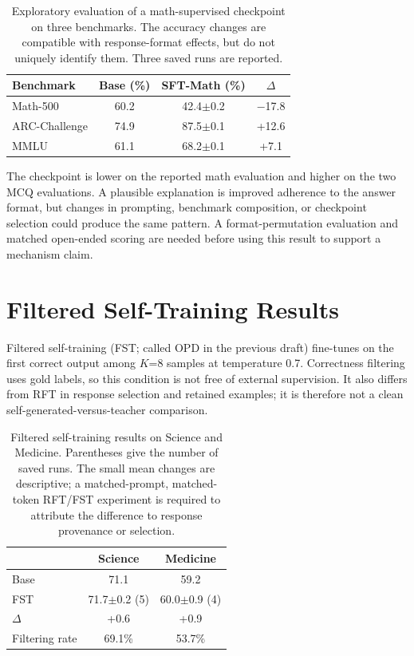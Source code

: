 \documentclass[11pt]{article}
\begin{document}
\begin{table}[h]
\centering
\small
\begin{tabular}{@{}lccc@{}}
\toprule
\textbf{Benchmark} & \textbf{Base (\%)} & \textbf{SFT-Math (\%)} & \textbf{$\Delta$} \\
\midrule
Math-500 & 60.2 & 42.4$\pm$0.2 & $-$17.8 \\
ARC-Challenge & 74.9 & 87.5$\pm$0.1 & +12.6 \\
MMLU & 61.1 & 68.2$\pm$0.1 & +7.1 \\
\bottomrule
\end{tabular}
\caption{Exploratory evaluation of a math-supervised checkpoint on three benchmarks. The accuracy changes are compatible with response-format effects, but do not uniquely identify them. Three saved runs are reported.}
\label{tab:sft_reverse}
\end{table}

The checkpoint is lower on the reported math evaluation and higher on the two MCQ evaluations. A plausible explanation is improved adherence to the answer format, but changes in prompting, benchmark composition, or checkpoint selection could produce the same pattern. A format-permutation evaluation and matched open-ended scoring are needed before using this result to support a mechanism claim.

\section{Filtered Self-Training Results}
\label{sec:opd_results}

Filtered self-training (FST; called OPD in the previous draft) fine-tunes on the first correct output among $K$=8 samples at temperature 0.7. Correctness filtering uses gold labels, so this condition is not free of external supervision. It also differs from RFT in response selection and retained examples; it is therefore not a clean self-generated-versus-teacher comparison.

\begin{table}[h]
\centering
\small
\begin{tabular}{@{}lcc@{}}
\toprule
& \textbf{Science} & \textbf{Medicine} \\
\midrule
Base & 71.1 & 59.2 \\
FST & 71.7$\pm$0.2 (5) & 60.0$\pm$0.9 (4) \\
$\Delta$ & +0.6 & +0.9 \\
\midrule
Filtering rate & 69.1\% & 53.7\% \\
\bottomrule
\end{tabular}
\caption{Filtered self-training results on Science and Medicine. Parentheses give the number of saved runs. The small mean changes are descriptive; a matched-prompt, matched-token RFT/FST experiment is required to attribute the difference to response provenance or selection.}
\label{tab:opd_results}
\end{table}
\end{document}
